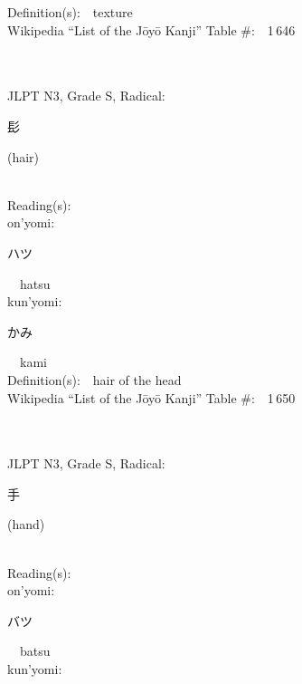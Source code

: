 \begin{multicols}{2}
Definition(s):\ \ texture \\
Wikipedia ``List of the J\=oy\=o Kanji'' Table \#:\ \ 1\,646 \\
\ \ \\
{\fontsize{34pt}{40pt}  }\ \ \\  %
{JLPT N3, Grade S, Radical:\ \ {\begin{CJK}{UTF8}{min} 髟 \end{CJK}} (hair) } \\
Reading(s):\ \ \\
{\hspace*{1em}}on'yomi:\ \ \\
{\hspace*{2em}}{\begin{CJK}{UTF8}{min} ハツ \end{CJK}}\ \ hatsu\ \ \\
{\hspace*{1em}}kun'yomi:\ \ \\
{\hspace*{2em}}{\begin{CJK}{UTF8}{min} かみ \end{CJK}}\ \ kami\ \ \\
Definition(s):\ \ hair of the head \\
Wikipedia ``List of the J\=oy\=o Kanji'' Table \#:\ \ 1\,650 \\
\ \ \\
{\fontsize{34pt}{40pt}  }\ \ \\  %
{JLPT N3, Grade S, Radical:\ \ {\begin{CJK}{UTF8}{min} 手 \end{CJK}} (hand) } \\
Reading(s):\ \ \\
{\hspace*{1em}}on'yomi:\ \ \\
{\hspace*{2em}}{\begin{CJK}{UTF8}{min} バツ \end{CJK}}\ \ batsu\ \ \\
{\hspace*{1em}}kun'yomi:\ \ \\

\end{multicols}
